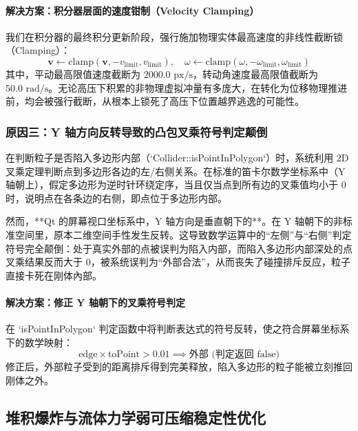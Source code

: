 \documentclass[11pt,a4paper]{article}
\begin{document}
\paragraph{解决方案：积分器层面的速度钳制（Velocity Clamping）}
我们在积分器的最终积分更新阶段，强行施加物理实体最高速度的非线性截断锁（Clamping）：
\begin{equation}
\mathbf{v} \leftarrow \text{clamp}(\mathbf{v}, -v_{\text{limit}}, v_{\text{limit}}), \quad \omega \leftarrow \text{clamp}(\omega, -\omega_{\text{limit}}, \omega_{\text{limit}})
\end{equation}
其中，平动最高限值速度截断为 $2000.0\text{ px/s}$，转动角速度最高限值截断为 $50.0\text{ rad/s}$。无论高压下积累的非物理虚拟冲量有多庞大，在转化为位移物理推进前，均会被强行截断，从根本上锁死了高压下位置越界逃逸的可能性。

\subsubsection{原因三：Y 轴方向反转导致的凸包叉乘符号判定颠倒}
在判断粒子是否陷入多边形内部（`Collider::isPointInPolygon`）时，系统利用 2D 叉乘定理判断点到多边形各边的左/右侧关系。在标准的笛卡尔数学坐标系中（Y 轴朝上），假定多边形为逆时针环绕定序，当且仅当点到所有边的叉乘值均小于 0 时，说明点在各条边的右侧，即点位于多边形内部。

然而，**Qt 的屏幕视口坐标系中，Y 轴方向是垂直朝下的**。在 Y 轴朝下的非标准空间里，原本二维空间手性发生反转。这导致数学运算中的“左侧”与“右侧”判定符号完全颠倒：处于真实外部的点被误判为陷入内部，而陷入多边形内部深处的点叉乘结果反而大于 0，被系统误判为“外部合法”，从而丧失了碰撞排斥反应，粒子直接卡死在刚体內部。

\paragraph{解决方案：修正 Y 轴朝下的叉乘符号判定}
在 `isPointInPolygon` 判定函数中将判断表达式的符号反转，使之符合屏幕坐标系下的数学映射：
\begin{equation}
\text{edge} \times \text{toPoint} > 0.01 \implies \text{外部 (判定返回 false)}
\end{equation}
修正后，外部粒子受到的距离排斥得到完美释放，陷入多边形的粒子能被立刻推回刚体之外。

\subsection{堆积爆炸与流体力学弱可压缩稳定性优化}
\end{document}
